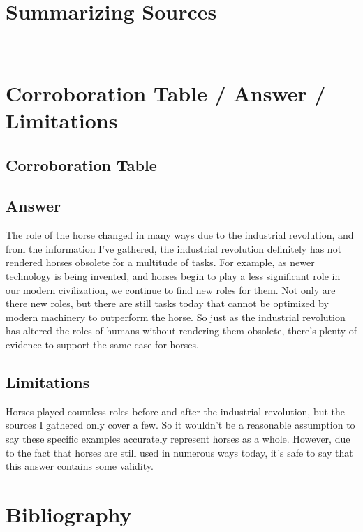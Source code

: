 \documentclass[12pt]{article}
\begin{document}
\section{Summarizing Sources}
 \\
 \newpage
 \newpage
 \newpage
 \newpage
 \newpage
 \newpage

\section{Corroboration Table / Answer / Limitations }
\subsection{Corroboration Table}


\subsection{Answer}
The role of the horse changed in many ways due to the industrial revolution, and from the information I've gathered, the industrial revolution definitely has not rendered horses obsolete for a multitude of tasks.  For example, as newer technology is being invented, and horses begin to play a less significant role in our modern civilization, we continue to find new roles for them.  Not only are there new roles, but there are still tasks today that cannot be optimized by modern machinery to outperform the horse.  So just as the industrial revolution has altered the roles of humans without rendering them obsolete, there's plenty of evidence to support the same case for horses.

\subsection{Limitations}
Horses played countless roles before and after the industrial revolution, but the sources I gathered only cover a few.  So it wouldn't be a reasonable assumption to say these specific examples accurately represent horses as a whole.  However, due to the fact that horses are still used in numerous ways today, it's safe to say that this answer contains some validity. 

\newpage

\section{Bibliography}


\newpage
\end{document}
